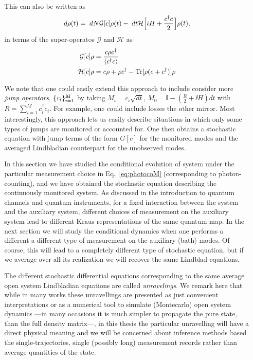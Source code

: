 This can also be written as
\begin{equation}\label{eq:nav1}
d\rho(t) = \; dN \mathcal{G}[c]\rho(t) -\; dt \mathcal{H}\Big[i H + \frac{c^\dagger c}{2}\Big] \rho(t),
\end{equation}
in terms of the super-operatos $\mathcal{G}$ and $\mathcal{H}$ as
\begin{align}\label{eq:superGH}
\mathcal{G}[c] \rho &= \frac{c \rho c^\dagger}{\mathinner{\langle c^\dagger c\rangle}}\\
\mathcal{H}[c] \rho &= c \rho + \rho c^\dagger - \text{Tr}[\rho(c + c^\dagger)] \rho
\end{align}

We note that one could easily extend this approach to include consider more \textit{jump operators}, $\lbrace c_i\rbrace_{i=1}^M$ by taking $M_i = c_i \sqrt{dt}$,  $M_0 = \mathbb{I}- (\frac{R}{2} + \ii H) dt$ with $R=\sum_{i=1}^M c_i^\dagger c_i$. For example, one could include losses the other mirror. Most interestingly, this approach lets us easily describe situations in which only some types of jumps are monitored or accounted for. One then obtains a stochastic equation with jump terms of the form $G[c]$ for the monitored modes and the averaged Lindbladian counterpart for the unobserved modes.

In this section we have studied the conditional evolution of system under the particular measurement choice in Eq.~\ref{eq:photocoM} (corresponding to photon-counting), and we have obtained the
stochastic equation describing the continuously monitored system. As discussed in the introduction to quantum channels and quantum instruments, for a fixed interaction between the system and the auxiliary system, different choices of measurement on the auxiliary system lead to different Kraus representations of the same quantum map.  In the next section we will study the conditional dynamics when one performs a different a different type of measurement on the auxiliary (bath) modes. Of course, this will lead to a completely different type of stochastic equation, but if we average over all its realization we will recover the same Lindblad equations.

The different stochastic differential equations corresponding to the same average open system Lindbladian equations are called \textit{unravelings}. We remark here that while in many works these unravellings are presented as just convenient interpretations or as a numerical  tool to simulate (Montecarlo) open system dynamics ---in many occasions it is much simpler to propagate the pure state, than the full density matrix---, in this thesis the particular unravelling will have a direct physical meaning and we will be concerned about inference methods based the single-trajectories, single (possibly long) measurement records rather than average quantities of the state.


